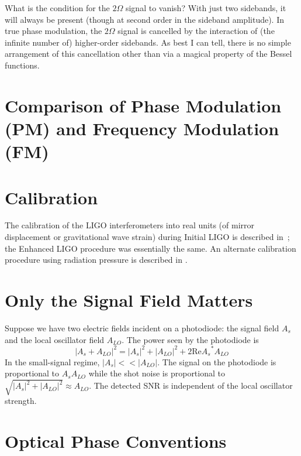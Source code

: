 What is the condition for the $2\Omega$ signal to vanish? With just
two sidebands, it will always be present (though at second order in
the sideband amplitude). In true phase modulation, the $2\Omega$
signal is cancelled by the interaction of (the infinite number of)
higher-order sidebands. As best I can tell, there is no simple
arrangement of this cancellation other than via a magical property of
the Bessel functions.

\section{Comparison of Phase Modulation (PM) and Frequency Modulation (FM)}

\section{Calibration}

The calibration of the LIGO interferometers into real units (of mirror
displacement or gravitational wave strain) during Initial LIGO is
described in~\cite{KisselCalibrationPaper}; the Enhanced LIGO procedure
was essentially the same.  An alternate calibration procedure using
radiation pressure is described in \cite{Goetz2010Gravitational}.

\section{Only the Signal Field Matters}

Suppose we have two electric fields incident on a photodiode: the
signal field $A_s$ and the local oscillator field $A_{LO}$.  The power
seen by the photodiode is
$$ \left| A_s + A_{LO} \right|^2 = 
   |A_s|^2 + |A_{LO}|^2 + 2 \mathrm{ Re } {A_s}^*A_{LO}$$
In the small-signal regime, $|A_s| << |A_{LO}|$.  The signal on the
photodiode is proportional to $A_s A_{LO}$ while the shot noise is
proportional to $\sqrt{|A_s|^2+|A_{LO}|^2}\approx A_{LO}$.  
  The detected SNR is independent of the local oscillator strength.

\section{Optical Phase Conventions}

